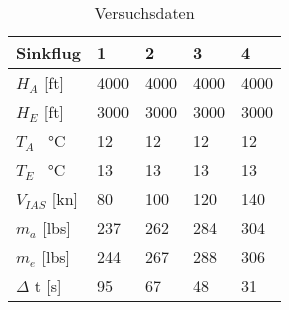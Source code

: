 \begin{table}[H]
	\centering
	\begin{tabular}{| l | l | l | l | l | }
\hline
	Sinkflug & 1 & 2 & 3 & 4 \\ \hline
	$H_A$ [ft] & 4000 & 4000 & 4000 & 4000 \\ \hline
	$H_E$ [ft]  & 3000 & 3000 & 3000 & 3000 \\ \hline
	$T_A$  \SI{}{\celsius} & 12 & 12 & 12 & 12 \\ \hline
	$T_E$  \SI{}{\celsius} & 13 & 13 & 13 & 13 \\ \hline
	$V_{IAS}$ [kn] & 80 & 100 & 120 & 140 \\ \hline
	$m_a$ [lbs] & 237 & 262 & 284 & 304 \\ \hline
	$m_e$ [lbs] & 244 & 267 & 288 & 306 \\ \hline
	$\Delta$ t [s] & 95 & 67 & 48 & 31 \\ \hline
\end{tabular}
	\caption{Versuchsdaten}
	\label{tab:VersuchDaten2}
\end{table}

